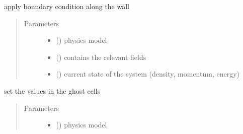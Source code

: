 \documentclass[letterpaper,10pt,english]{sphinxmanual}
\begin{document}
\begin{fulllineitems}
\begin{fulllineitems}
\label{\detokenize{autoapi/NS_Airfoil/index:NS_Airfoil.NS_Airfoil.bc_wall}}
\sphinxAtStartPar
apply boundary condition along the wall
\begin{quote}\begin{description}
\item[{Parameters}] \leavevmode\begin{itemize}
\item {} 
\sphinxAtStartPar
{} ({\hyperref[\detokenize{autoapi/NavierStokes/index:NavierStokes.NavierStokes}]{}}) \textendash{} physics model

\item {} 
\sphinxAtStartPar
{} ({\hyperref[\detokenize{autoapi/Workspace/index:Workspace.Workspace}]{}}) \textendash{} contains the relevant fields

\item {} 
\sphinxAtStartPar
{} ({\hyperref[\detokenize{autoapi/Field/index:Field.Field}]{}}) \textendash{} current state of the system (density, momentum, energy)

\end{itemize}

\end{description}\end{quote}

\end{fulllineitems}


\begin{fulllineitems}
\label{\detokenize{autoapi/NS_Airfoil/index:NS_Airfoil.NS_Airfoil.halo}}
\sphinxAtStartPar
set the values in the ghost cells
\begin{quote}\begin{description}
\item[{Parameters}] \leavevmode\begin{itemize}
\item {} 
\sphinxAtStartPar
{} ({\hyperref[\detokenize{autoapi/NavierStokes/index:NavierStokes.NavierStokes}]{}}) \textendash{} physics model


\end{itemize}
\end{description}
\end{quote}
\end{fulllineitems}
\end{fulllineitems}
\end{document}
